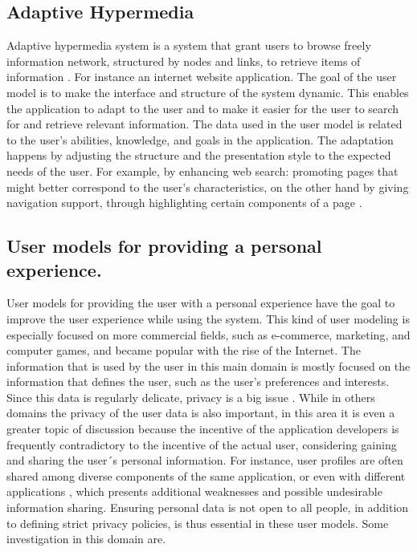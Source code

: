 \subsection{Adaptive Hypermedia}

Adaptive hypermedia system is a system that grant users to browse freely
information network,  structured by nodes and links, to retrieve items of
information \cite{deepa2012adaptive}. For instance an internet website
application. The goal of the user model is to make the interface and structure
of the system dynamic. This enables the application to adapt to the user and to
make it easier for the user to search for and retrieve relevant information.
The data used in the user model is related to the user’s abilities, knowledge,
and goals in the application. The adaptation happens by adjusting the structure
and the presentation style to the expected needs of the user. For example, by
enhancing web search: promoting pages that might better correspond to the user’s
characteristics, on the other hand by giving navigation support, through
highlighting certain components of a page \cite{razmerita2012user}.

\subsection{User models for providing a personal experience.}

User models for providing the user with a personal experience have the goal to
improve the user experience while using the system.  This kind of user modeling
is especially focused on more commercial fields, such as e-commerce, marketing,
and computer games, and became popular with the rise of the Internet.  The
information that is used by the user in this main domain is mostly focused on
the information that defines the user, such as the user’s preferences and
interests. Since this data is regularly delicate, privacy is a  big issue
\cite{toch2012personalization}. While in others domains the privacy of the user
data is also important, in this area it is even a greater topic of discussion
because the incentive of the application developers is frequently contradictory
to the incentive of the actual user, considering gaining and sharing the user´s
personal information. For instance, user profiles are often shared among diverse
components of the same application, or even with different applications
\cite{brun2010compass} \cite{karam2012modeling}, which presents additional
weaknesses and possible undesirable information sharing.  Ensuring personal data
is not open to all people, in addition to defining strict privacy policies, is
thus essential in these user models. Some investigation in this domain are.

